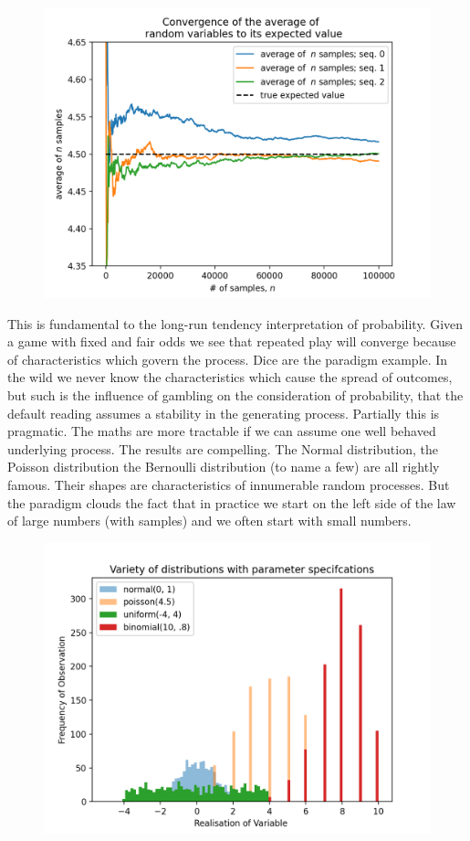 \documentclass[10pt,a4paper,notitlepage,twocolumn]{article}
\begin{document}
\begin{figure}[H]
  \includegraphics[width=\linewidth]{./Plots/convergence_of_law_of_large_numbers.png}
\end{figure}

\noindent This is fundamental to the long-run tendency interpretation of probability. Given a game with fixed and fair odds we see that repeated play will converge because of characteristics which govern the process. Dice are the paradigm example.  In the wild we never know the characteristics which cause the spread of outcomes, but such is the influence of gambling on the consideration of probability, that the default reading assumes a stability in the generating process. Partially this is pragmatic. The maths are more tractable if we can assume one well behaved underlying process. The results are compelling. The Normal distribution, the Poisson distribution the Bernoulli distribution (to name a few) are all rightly famous. Their shapes are characteristics of innumerable random processes. But the paradigm clouds the fact that in practice we start on the left side of the law of large numbers (with samples) and we often start with small numbers. 

\begin{figure}[H]
  \includegraphics[width=\linewidth]{./Plots/variety_of_distributions.png}
\end{figure}
\end{document}
